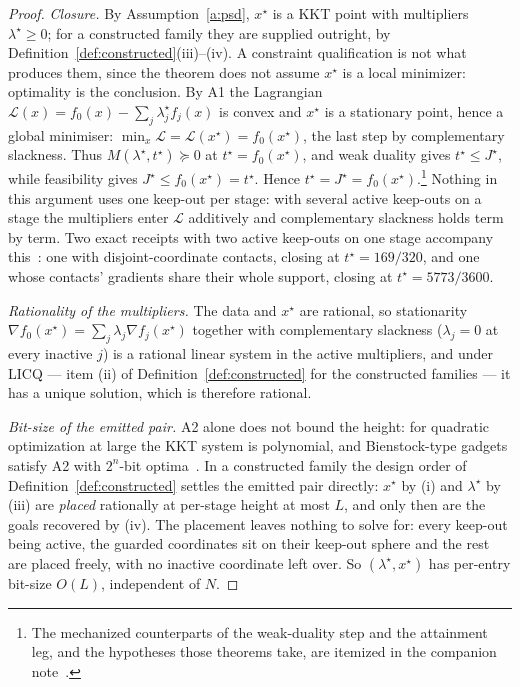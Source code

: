 \documentclass[11pt]{article}
\theoremstyle{definition}
\theoremstyle{remark}
\renewcommand{\_}{\ifdim\fontdimen3\font=0pt\relax\char`\_\else\textunderscore\fi\hspace{0pt}}
\begin{document}
\begin{proof}
\emph{Closure.} By Assumption~\ref{a:psd}, $x^\star$ is a KKT point with
multipliers $\lambda^\star\ge0$; for a constructed family they are supplied
outright, by Definition~\ref{def:constructed}(iii)--(iv). A constraint
qualification is not what produces them, since the theorem does not assume
$x^\star$ is a local minimizer: optimality is the conclusion. By
A1 the Lagrangian $\mathcal L(x)=f_0(x)-\sum_j\lambda^\star_jf_j(x)$ is
convex and $x^\star$ is a stationary point, hence a global minimiser:
$\min_x\mathcal L=\mathcal L(x^\star)=f_0(x^\star)$, the last step by
complementary slackness. Thus $M(\lambda^\star,t^\star)\succeq0$ at
$t^\star=f_0(x^\star)$, and weak duality gives $t^\star\le J^\star$, while
feasibility gives $J^\star\le f_0(x^\star)=t^\star$. Hence
$t^\star=J^\star=f_0(x^\star)$.\footnote{The mechanized counterparts of the
weak-duality step and the attainment leg, and the hypotheses those theorems
take, are itemized in the companion note~\cite{leannote}.} Nothing in this
argument uses one keep-out per stage: with several active keep-outs on a
stage the multipliers enter $\mathcal L$ additively and complementary
slackness holds term by term. Two exact receipts with two active keep-outs
on one stage accompany this~\cite{leannote}: one with disjoint-coordinate
contacts, closing at $t^\star=169/320$, and one whose contacts' gradients
share their whole support, closing at $t^\star=5773/3600$.

\emph{Rationality of the multipliers.} The data and $x^\star$ are rational,
so stationarity $\nabla f_0(x^\star)=\sum_j\lambda_j\nabla f_j(x^\star)$
together with complementary slackness ($\lambda_j=0$ at every inactive $j$)
is a rational linear system in the active multipliers, and under LICQ ---
item (ii) of Definition~\ref{def:constructed} for the constructed families
--- it has a unique solution, which is therefore rational.

\emph{Bit-size of the emitted pair.} A2 alone does not bound the height: for
quadratic optimization at large the KKT system is polynomial, and
Bienstock-type gadgets satisfy A2 with $2^n$-bit
optima~\cite{bienstock2020}. In a constructed family the design order of
Definition~\ref{def:constructed} settles the emitted pair directly:
$x^\star$ by (i) and $\lambda^\star$ by (iii) are \emph{placed} rationally at
per-stage height at most $L$, and only then are the goals recovered by (iv).
The placement leaves nothing to solve for: every keep-out being active, the
guarded coordinates sit on their keep-out sphere and the rest are placed
freely, with no inactive coordinate left over. So
$(\lambda^\star,x^\star)$ has per-entry bit-size $O(L)$, independent of $N$.


\end{proof}
\end{document}
